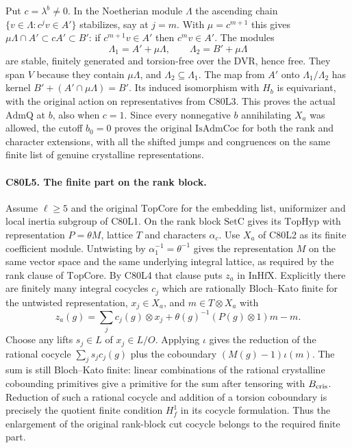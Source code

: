 Put $c=\lambda^b\ne0$. In the Noetherian module $\Lambda$ the
ascending chain
$\{v\in\Lambda:c^jv\in A'\}$ stabilizes, say at $j=m$.
With $\mu=c^{m+1}$ this gives
$\mu\Lambda\cap A'\subset cA'\subset B'$:
if $c^{m+1}v\in A'$ then $c^m v\in A'$.
The modules
\[
     \Lambda_1=A'+\mu\Lambda,\qquad
     \Lambda_2=B'+\mu\Lambda
\]
are stable, finitely generated and torsion-free over the DVR,
hence free. They span $V$ because they contain $\mu\Lambda$,
and $\Lambda_2\subseteq\Lambda_1$. The map from $A'$ onto
$\Lambda_1/\Lambda_2$ has kernel
$B'+(A'\cap\mu\Lambda)=B'$. Its induced isomorphism with $H_b$
is equivariant, with the original action on representatives from
C80L3. This proves the actual $\mathrm{AdmQ}$ at $b$, also when
$c=1$. Since every nonnegative $b$ annihilating $X_a$ was allowed,
the cutoff $b_0=0$ proves the original
$\mathrm{IsAdmCoc}$ for both the rank and character extensions,
with all the shifted jumps and congruences on the same finite list
of genuine crystalline representations.

\paragraph{C80L5. The finite part on the rank block.}
Assume $\ell\ge5$ and the original $\mathrm{TopCore}$ for the
embedding list, uniformizer and local inertia subgroup of C80L1.
On the rank block $\mathrm{SetC}$ gives its $\mathrm{TopHyp}$ with
representation $P=\theta M$, lattice $T$ and characters $\alpha_c$.
Use $X_a$ of C80L2 as its finite coefficient module.
Untwisting by $\alpha_1^{-1}=\theta^{-1}$ gives the representation
$M$ on the same vector space and the same underlying integral
lattice, as required by the rank clause of $\mathrm{TopCore}$.
By C80L4 that clause puts $z_a$ in $\mathrm{InHfX}$.
Explicitly there are finitely many integral cocycles $c_j$ which
are rationally Bloch--Kato finite for the untwisted representation,
$x_j\in X_a$, and $m\in T\otimes X_a$ with
\[
 z_a(g)=\sum_j c_j(g)\otimes x_j+
                \theta(g)^{-1}(P(g)\otimes1)m-m .
\]
Choose any lifts $s_j\in L$ of $x_j\in L/O$. Applying $\iota$
gives the reduction of the rational cocycle $\sum_j s_j c_j(g)$
plus the coboundary $(M(g)-1)\iota(m)$. The sum is still
Bloch--Kato finite: linear combinations of the rational crystalline
cobounding primitives give a primitive for the sum after tensoring
with $B_{\rm cris}$. Reduction of such a rational cocycle and addition
of a torsion coboundary is precisely the quotient finite condition
$H_f^1$ in its cocycle formulation. Thus the enlargement of the
original rank-block cut cocycle belongs to the required finite part.


